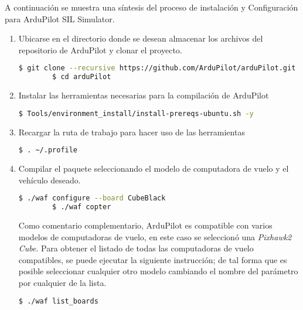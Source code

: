 A continuación se muestra una síntesis del proceso de instalación y Configuración para ArduPilot SIL Simulator.

\begin{enumerate}

    \item Ubicarse en el directorio donde se desean almacenar los archivos del repositorio de ArduPilot y clonar el proyecto.

    \begin{lstlisting}[language = bash]
        $ git clone --recursive https://github.com/ArduPilot/arduPilot.git
        $ cd arduPilot
    \end{lstlisting}    

    \item Instalar las herramientas necesarias para la compilación de ArduPilot
    
    \begin{lstlisting}[language = bash]
        $ Tools/environment_install/install-prereqs-ubuntu.sh -y
    \end{lstlisting}   

    \item Recargar la ruta de trabajo para hacer uso de las herramientas
    
    \begin{lstlisting}[language = bash]
        $ . ~/.profile
    \end{lstlisting}   

    \item Compilar el paquete seleccionando el modelo de computadora de vuelo y el vehículo deseado.

    \begin{lstlisting}[language = bash]
        $ ./waf configure --board CubeBlack
        $ ./waf copter
    \end{lstlisting}

    Como comentario complementario, ArduPilot es compatible con varios modelos de computadoras de vuelo, en este caso se seleccionó una \textit{Pixhawk2 Cube}. Para obtener el listado de todas las computadoras de vuelo compatibles, se puede ejecutar la siguiente instrucción; de tal forma que es posible seleccionar cualquier otro modelo cambiando el nombre del parámetro por cualquier de la lista. 

    \begin{lstlisting}[language = bash]
        $ ./waf list_boards
    \end{lstlisting}


\end{enumerate}
